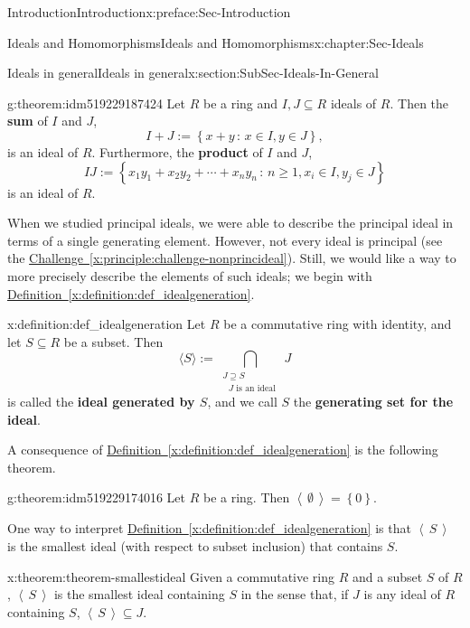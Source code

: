 \documentclass[oneside,10pt,]{book}
\newcommand{\xreffont}{\relax}
\newcommand{\terminology}[1]{\textbf{#1}}
\numberwithin{equation}{section}
\renewcommand{\ge}{\geqslant}
\newcommand{\ideal}[1]{\left\langle\, #1 \,\right\rangle}
\newcommand{\set}[1]{\left\{ {#1} \right\}}
\newcommand{\setof}[2]{{\left\{#1\,\colon\,#2\right\}}}
\begin{document}
\begin{preface}{Introduction}{}{Introduction}{}{}{x:preface:Sec-Introduction}
\begin{chapterptx}{Ideals and Homomorphisms}{}{Ideals and Homomorphisms}{}{}{x:chapter:Sec-Ideals}
\begin{sectionptx}{Ideals in general}{}{Ideals in general}{}{}{x:section:SubSec-Ideals-In-General}
\begin{theorem}{}{}{g:theorem:idm519229187424}%
Let \(R\) be a ring and \(I,J\subseteq R\) ideals of \(R\). Then the \terminology{sum} of \(I\) and \(J\),%
\begin{equation*}
I+J := \setof{x+y}{x\in I, y\in J},
\end{equation*}
is an ideal of \(R\). Furthermore, the \terminology{product} of \(I\) and \(J\),%
\begin{equation*}
IJ := \setof{x_1 y_1 + x_2 y_2 + \cdots + x_n y_n}{n\ge 1, x_i \in I, y_j\in J}
\end{equation*}
is an ideal of \(R\).%
\end{theorem}
When we studied principal ideals, we were able to describe the principal ideal in terms of a single generating element. However, not every ideal is principal (see the \hyperref[x:principle:challenge-nonprincideal]{Challenge~{\xreffont\ref{x:principle:challenge-nonprincideal}}}). Still, we would like a way to more precisely describe the elements of such ideals; we begin with \hyperref[x:definition:def_idealgeneration]{Definition~{\xreffont\ref{x:definition:def_idealgeneration}}}.%
\begin{definition}{}{x:definition:def_idealgeneration}%
Let \(R\) be a commutative ring with identity, and let \(S\subseteq R\) be a subset. Then%
\begin{equation}
\langle S \rangle := \bigcap\limits_{\substack{J\supseteq S\\\text{ \(J\) is an ideal } } } J\label{x:men:eq_idealgeneratedbyset}
\end{equation}
is called the \terminology{ideal generated by \(S\)}, and we call \(S\) the \terminology{generating set for the ideal}.%
\end{definition}
A consequence of \hyperref[x:definition:def_idealgeneration]{Definition~{\xreffont\ref{x:definition:def_idealgeneration}}} is the following theorem.%
\begin{theorem}{}{}{g:theorem:idm519229174016}%
Let \(R\) be a ring. Then \(\ideal{\emptyset} = \set{0}\).\end{theorem}
One way to interpret \hyperref[x:definition:def_idealgeneration]{Definition~{\xreffont\ref{x:definition:def_idealgeneration}}} is that \(\ideal{S}\) is the smallest ideal (with respect to subset inclusion) that contains \(S\).%
\begin{theorem}{}{}{x:theorem:theorem-smallestideal}%
Given a commutative ring \(R\) and a subset \(S\) of \(R\), \(\ideal{S}\) is the smallest ideal containing \(S\) in the sense that, if \(J\) is any ideal of \(R\) containing \(S\), \(\ideal{S}\subseteq J\).%

\end{theorem}
\end{sectionptx}
\end{chapterptx}
\end{preface}
\end{document}
